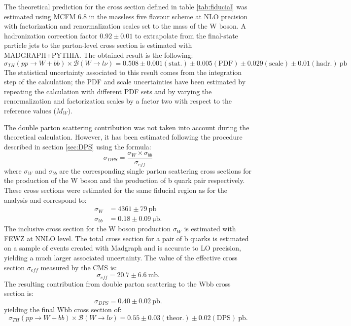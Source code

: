 The theoretical prediction for the cross section defined in table \ref{tab:fiducial} was estimated using MCFM 6.8 in the massless five flavour scheme at NLO precision with factorization and renormalization scales set to the mass of the W boson. A hadronization correction factor $0.92\pm 0.01$ to extrapolate from the final-state particle jets to the parton-level cross section is estimated with MADGRAPH+PYTHIA. The obtained result is the following:
\begin{equation*}
\sigma_{TH}(pp\rightarrow W+bb)\times \mathcal{B}(W\rightarrow l\nu)=0.508\pm 0.001 (\mathrm{stat.}) \pm 0.005 (\mathrm{PDF}) \pm 0.029 (\mathrm{scale}) \pm 0.01 (\mathrm{hadr.}) \mathrm{\ pb}
\end{equation*} 
The statistical uncertainty associated to this result comes from the integration step of the calculation; the PDF and scale uncertainties have been estimated by repeating the calculation with different PDF sets and by varying the renormalization and factorization scales by a factor two with respect to the reference values ($M_W$).
\par The double parton scattering contribution was not taken into account during the theoretical calculation. However, it has been estimated following the procedure described in section \ref{sec:DPS} using the formula:
\begin{equation}
\sigma_{DPS} = \frac{\sigma_W \times \sigma_{bb}}{\sigma_{eff}}
\end{equation}
where $\sigma_W$ and $\sigma_{bb}$ are the corresponding single parton scattering cross sections for the production of the W boson and the production of b quark pair respectively. These cross sections were estimated for the same fiducial region as for the analysis and correspond to:
\begin{align*}
\sigma_{W} &= 4361 \pm 79 \mathrm{\ pb} \\
\sigma_{bb} &= 0.18 \pm 0.09 \mathrm{\ \mu b}.
\end{align*}
The inclusive cross section for the W boson production $\sigma_W$ is estimated with FEWZ \cite{Gavin:2012sy} at NNLO level. The total cross section for a pair of b quarks is estimated on a sample of events created with Madgraph and is accurate to LO precision, yielding a much larger associated uncertainty. The value of the effective cross section $\sigma_{eff}$ measured by the CMS is:
\begin{equation*}
\sigma_{eff}=20.7 \pm 6.6 \mathrm{\ mb}.
\end{equation*}   
The resulting contribution from double parton scattering to the Wbb cross section is:
\begin{equation*}
\sigma_{DPS}=0.40 \pm 0.02 \mathrm{\ pb}.
\end{equation*}
yielding the final Wbb cross section of:
\begin{equation*}
\sigma_{TH}(pp\rightarrow W+bb)\times \mathcal{B}(W\rightarrow l\nu) = 0.55 \pm 0.03 \mathrm{(theor.)} \pm 0.02 \mathrm{(DPS)} \mathrm{\ pb}.
\end{equation*}

